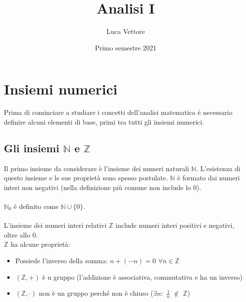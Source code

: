 \documentclass{article}
\title{Analisi I}
\author{Luca Vettore}
\date{Primo semestre 2021}
\begin{document}
\maketitle

\section{Insiemi numerici}
Prima di cominciare a studiare i concetti dell'analisi matematica è necessario definire alcuni elementi di base, primi tra tutti gli insiemi numerici.

\subsection{Gli insiemi $\mathds{N}$ e $\mathds{Z}$}
Il primo insieme da considerare è l'insieme dei numeri naturali $\mathds{N}$. L'esistenza di questo insieme e le sue proprietà sono spesso postulate. $\mathds{N}$ è formato dai numeri interi non negativi (nella definizione più comune non include lo 0).\\\\
$\mathds{N}_0$ è definito come $\mathds{N} \cup \{0\}$.\\\\
L'insieme dei numeri interi relativi $\mathds{Z}$ include numeri interi positivi e negativi, oltre allo 0.\\
$\mathds{Z}$ ha alcune proprietà:
\begin{itemize}
    \item
    Possiede l'inverso della somma: $n + (-n) = 0$ $\forall n \in \mathds{Z}$
    \item
    $(\mathds{Z}, +)$ è u gruppo (l'addizione è associativa, commutativa e ha un inverso)
    \item
    $(\mathds{Z}, \cdot)$ non è un gruppo perché non è chiuso ($\exists n:$ $\frac{1}{n}$ $\notin$ $\mathds{Z}$)
\end{itemize}
\end{document}
